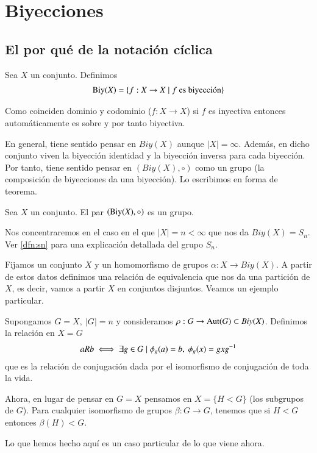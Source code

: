
\chapter{Biyecciones}

\section{El por qué de la notación cíclica}

\begin{dfn}
	Sea $X$ un conjunto. Definimos
	\begin{align*}
		\text{Biy}(X) = \{f: X \to X \mid f \text{ es biyección}\}
	\end{align*}
\end{dfn}

Como coinciden dominio y codominio ($f:X \to X$) si $f$ es inyectiva entonces automáticamente es sobre y por tanto biyectiva.

En general, tiene sentido pensar en $Biy(X)$ aunque $|X| = \infty$. Además, en dicho conjunto viven la biyección identidad y la biyección inversa para cada biyección. Por tanto, tiene sentido pensar en $(Biy(X), \circ)$ como un grupo (la composición de biyecciones da una biyección). Lo escribimos en forma de teorema.

\begin{thm}
	Sea $X$ un conjunto. El par $(\text{Biy}(X), \circ)$ es un grupo.
\end{thm}

Nos concentraremos en el caso en el que $|X| = n < \infty$ que nos da $Biy(X) = S_n$. Ver \autoref{dfn:sn} para una explicación detallada del grupo $S_n$.

Fijamos un conjunto $X$ y un homomorfismo de grupos $\alpha: X \to Biy(X)$. A partir de estos datos definimos una relación de equivalencia que nos da una partición de $X$, es decir, vamos a partir $X$ en conjuntos disjuntos. Veamos un ejemplo particular.

\begin{ej}
	Supongamos $G = X,\ |G| = n$ y consideramos $\rho: G \to \text{Aut}(G) \subset Biy(X)$. Definimos la relación en $X = G$
	\begin{align*}
	aRb \iff \exists g \in G \mid \phi_g(a) = b,\ \phi_g(x) = gxg^{-1}
	\end{align*}
	que es la relación de conjugación dada por el isomorfismo de conjugación de toda la vida.
	
	Ahora, en lugar de pensar en $G = X$ pensamos en $X = \{H < G\}$ (los subgrupos de $G$). Para cualquier isomorfismo de grupos $\beta: G \to G$, tenemos que si $H < G$ entonces $\beta(H) < G$.
	
	Lo que hemos hecho aquí es un caso particular de lo que viene ahora.
\end{ej}

